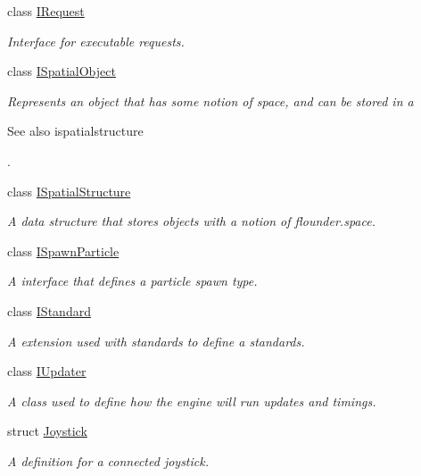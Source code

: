 \begin{DoxyCompactItemize}
class \hyperlink{class_flounder_1_1_i_request}{I\+Request}
\begin{DoxyCompactList}\small\item\em Interface for executable requests. \end{DoxyCompactList}\item 
class \hyperlink{class_flounder_1_1_i_spatial_object}{I\+Spatial\+Object}
\begin{DoxyCompactList}\small\item\em Represents an object that has some notion of space, and can be stored in a \begin{DoxySeeAlso}{See also}
ispatialstructure


\end{DoxySeeAlso}
. \end{DoxyCompactList}\item 
class \hyperlink{class_flounder_1_1_i_spatial_structure}{I\+Spatial\+Structure}
\begin{DoxyCompactList}\small\item\em A data structure that stores objects with a notion of flounder.\+space. \end{DoxyCompactList}\item 
class \hyperlink{class_flounder_1_1_i_spawn_particle}{I\+Spawn\+Particle}
\begin{DoxyCompactList}\small\item\em A interface that defines a particle spawn type. \end{DoxyCompactList}\item 
class \hyperlink{class_flounder_1_1_i_standard}{I\+Standard}
\begin{DoxyCompactList}\small\item\em A extension used with standards to define a standards. \end{DoxyCompactList}\item 
class \hyperlink{class_flounder_1_1_i_updater}{I\+Updater}
\begin{DoxyCompactList}\small\item\em A class used to define how the engine will run updates and timings. \end{DoxyCompactList}\item 
struct \hyperlink{struct_flounder_1_1_joystick}{Joystick}
\begin{DoxyCompactList}\small\item\em A definition for a connected joystick. \end{DoxyCompactList}\item 

\end{DoxyCompactItemize}
